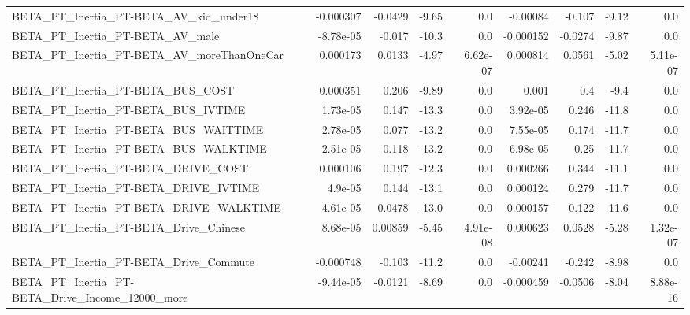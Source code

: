 \begin{tabular}{lrrrrrrrr}
BETA\_PT\_Inertia\_PT-BETA\_AV\_kid\_under18             &   -0.000307 &      -0.0429 &    -9.65 &      0.0 &   -0.00084 &      -0.107 &        -9.12 &           0.0 \\
BETA\_PT\_Inertia\_PT-BETA\_AV\_male                    &   -8.78e-05 &       -0.017 &    -10.3 &      0.0 &  -0.000152 &     -0.0274 &        -9.87 &           0.0 \\
BETA\_PT\_Inertia\_PT-BETA\_AV\_moreThanOneCar          &    0.000173 &       0.0133 &    -4.97 & 6.62e-07 &   0.000814 &      0.0561 &        -5.02 &      5.11e-07 \\
BETA\_PT\_Inertia\_PT-BETA\_BUS\_COST                   &    0.000351 &        0.206 &    -9.89 &      0.0 &      0.001 &         0.4 &         -9.4 &           0.0 \\
BETA\_PT\_Inertia\_PT-BETA\_BUS\_IVTIME                 &    1.73e-05 &        0.147 &    -13.3 &      0.0 &   3.92e-05 &       0.246 &        -11.8 &           0.0 \\
BETA\_PT\_Inertia\_PT-BETA\_BUS\_WAITTIME               &    2.78e-05 &        0.077 &    -13.2 &      0.0 &   7.55e-05 &       0.174 &        -11.7 &           0.0 \\
BETA\_PT\_Inertia\_PT-BETA\_BUS\_WALKTIME               &    2.51e-05 &        0.118 &    -13.2 &      0.0 &   6.98e-05 &        0.25 &        -11.7 &           0.0 \\
BETA\_PT\_Inertia\_PT-BETA\_DRIVE\_COST                 &    0.000106 &        0.197 &    -12.3 &      0.0 &   0.000266 &       0.344 &        -11.1 &           0.0 \\
BETA\_PT\_Inertia\_PT-BETA\_DRIVE\_IVTIME               &     4.9e-05 &        0.144 &    -13.1 &      0.0 &   0.000124 &       0.279 &        -11.7 &           0.0 \\
BETA\_PT\_Inertia\_PT-BETA\_DRIVE\_WALKTIME             &    4.61e-05 &       0.0478 &    -13.0 &      0.0 &   0.000157 &       0.122 &        -11.6 &           0.0 \\
BETA\_PT\_Inertia\_PT-BETA\_Drive\_Chinese              &    8.68e-05 &      0.00859 &    -5.45 & 4.91e-08 &   0.000623 &      0.0528 &        -5.28 &      1.32e-07 \\
BETA\_PT\_Inertia\_PT-BETA\_Drive\_Commute              &   -0.000748 &       -0.103 &    -11.2 &      0.0 &   -0.00241 &      -0.242 &        -8.98 &           0.0 \\
BETA\_PT\_Inertia\_PT-BETA\_Drive\_Income\_12000\_more    &   -9.44e-05 &      -0.0121 &    -8.69 &      0.0 &  -0.000459 &     -0.0506 &        -8.04 &      8.88e-16 \\

\end{tabular}
